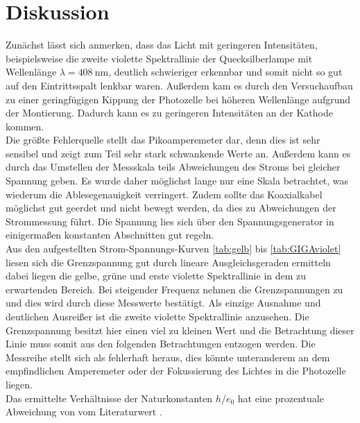 \section{Diskussion}

Zunächst lässt sich anmerken, dass das Licht mit geringeren Intensitäten, beispielsweise die zweite violette Spektrallinie der Quecksilberlampe mit Wellenlänge $\lambda = \SI{408}{\nano\meter}$, deutlich schwieriger erkennbar und somit nicht 
so gut auf den Eintrittsspalt lenkbar waren. Außerdem kam es durch den Versuchaufbau zu einer geringfügigen Kippung der Photozelle bei höheren Wellenlänge aufgrund der Montierung. Dadurch kann es zu geringeren Intensitäten an der Kathode kommen.
\\
Die größte Fehlerquelle stellt das Pikoamperemeter dar, denn dies ist sehr sensibel und zeigt zum Teil sehr stark schwankende Werte an. Außerdem kann es durch das Umstellen der Messskala teils Abweichungen des Stroms bei gleicher Spannung geben. Es wurde daher
möglichst lange nur eine Skala betrachtet, was wiederum die Ablesegenauigkeit verringert. Zudem sollte das Koaxialkabel möglichst gut geerdet und nicht bewegt werden, da dies zu Abweichungen der Strommessung führt. Die Spannung lies sich über den 
Spannungsgenerator in einigermaßen konstanten Abschnitten gut regeln.
\\
Aus den aufgestellten Strom-Spannungs-Kurven \ref{tab:gelb} bis \ref{tab:GIGAviolet} liesen sich die Grenzspannung gut durch lineare Ausgleichsgeraden ermitteln dabei liegen die gelbe, grüne und erste violette Spektrallinie in dem zu erwartenden 
Bereich. Bei steigender Frequenz nehmen die Grenzspannungen zu und dies wird durch diese Messwerte bestätigt. Als einzige Ausnahme und deutlichen Ausreißer ist die zweite violette Spektrallinie anzusehen. Die Grenzspannung besitzt hier einen viel zu kleinen
Wert und die Betrachtung dieser Linie muss somit aus den folgenden Betrachtungen entzogen werden. Die Messreihe stellt sich als fehlerhaft heraus, dies könnte unteranderem an dem empfindlichen Amperemeter oder der Fokussierung des Lichtes in die Photozelle liegen.
\\
Das ermittelte Verhältnisse der Naturkonstanten $h$/$e_{0}$ hat eine prozentuale Abweichung von
%
vom Literaturwert \cite{lit}.